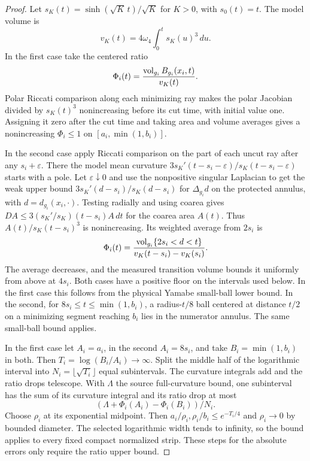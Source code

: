 \begin{proof}
Let \(s_K(t)=\sinh(\sqrt K\,t)/\sqrt K\) for \(K>0\), with
\(s_0(t)=t\). The model volume is
\[
 v_K(t)=4\omega_4\int_0^t s_K(u)^3\,du .
\]
In the first case take the centered ratio
\[
 \Phi_i(t)=\frac{\operatorname{vol}_{g_i}B_{g_i}(x_i,t)}{v_K(t)} .
\]
Polar Riccati comparison along each minimizing ray makes
the polar Jacobian divided by \(s_K(t)^3\) nonincreasing
before its cut time, with initial value one. Assigning it
zero after the cut time and taking area and volume averages
gives a nonincreasing \(\Phi_i\le1\) on
\([a_i,\min(1,b_i)]\).

In the second case apply Riccati comparison on the part of
each uncut ray after any \(s_i+\varepsilon\). There the
model mean curvature \(3s_K'(t-s_i-\varepsilon)/
s_K(t-s_i-\varepsilon)\) starts with a pole. Let
\(\varepsilon\downarrow0\) and use the nonpositive singular
Laplacian to get the weak upper bound
\(3s_K'(d-s_i)/s_K(d-s_i)\) for \(\Delta_{g_i}d\) on the
protected annulus, with \(d=d_{g_i}(x_i,\cdot)\).
Testing radially and using coarea gives
\(DA\le 3(s_K'/s_K)(t-s_i)A\,dt\) for the coarea
area \(A(t)\). Thus \(A(t)/s_K(t-s_i)^3\) is nonincreasing.
Its weighted average from \(2s_i\) is
\[
 \Phi_i(t)=\frac{\operatorname{vol}_{g_i}\{2s_i<d<t\}}
                 {v_K(t-s_i)-v_K(s_i)} .
\]
The average decreases, and the measured transition volume
bounds it uniformly from above at \(4s_i\). Both cases have
a positive floor on the intervals used below. In the first
case this follows from the physical Yamabe small-ball
lower bound. In the second, for \(8s_i\le t\le\min(1,b_i)\),
a radius-\(t/8\) ball centered at distance \(t/2\) on a
minimizing segment reaching \(b_i\) lies in the numerator
annulus. The same small-ball bound applies.

In the first case let \(A_i=a_i\), in the second
\(A_i=8s_i\), and take \(B_i=\min(1,b_i)\) in both.
Then \(T_i=\log(B_i/A_i)\to\infty\).
Split the middle half of the logarithmic interval into
\(N_i=\lfloor\sqrt{T_i}\rfloor\) equal subintervals.
The curvature integrals add and the ratio drops telescope.
With \(\Lambda\) the source full-curvature bound, one
subinterval has the sum of its curvature integral and
its ratio drop at most
\[
 (\Lambda+\Phi_i(A_i)-\Phi_i(B_i))/N_i.
\]
Choose \(\rho_i\) at its exponential midpoint. Then
\(a_i/\rho_i,\rho_i/b_i\le e^{-T_i/4}\) and
\(\rho_i\to0\) by bounded diameter. The selected logarithmic
width tends to infinity, so the bound applies to every
fixed compact normalized strip. These steps for the
absolute errors only require the ratio upper bound.


\end{proof}
